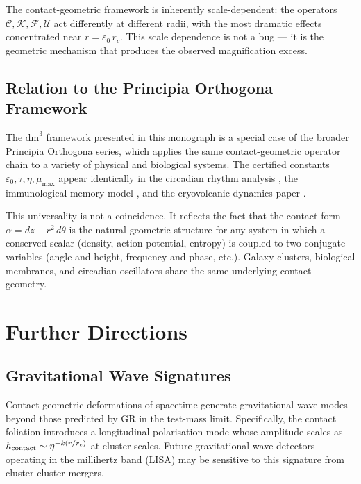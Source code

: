 \documentclass[11pt,a4paper,openright]{book}
\theoremstyle{dm3thm}
\theoremstyle{dm3def}
\newcommand{\dm}{\mathrm{dm}^3}
\newcommand{\eps}{\varepsilon_0}
\newcommand{\rc}{r_c}
\newcommand{\etaT}{\eta}   %
\newcommand{\mumax}{\mu_{\max}}
\newcommand{\UU}{\mathcal{U}}
\newcommand{\FF}{\mathcal{F}}
\newcommand{\KK}{\mathcal{K}}
\newcommand{\CC}{\mathcal{C}}
\begin{document}
The contact-geometric framework is inherently scale-dependent: the operators
$\CC, \KK, \FF, \UU$ act differently at different radii, with the most
dramatic effects concentrated near $r = \eps\,\rc$.  This scale dependence
is not a bug — it is the geometric mechanism that produces the observed
magnification excess.

\section{Relation to the Principia Orthogona Framework}

The $\dm$ framework presented in this monograph is a special case of the
broader Principia Orthogona series, which applies the same contact-geometric
operator chain to a variety of physical and biological systems.  The certified
constants $\eps, \tau, \etaT, \mumax$ appear identically in the circadian
rhythm analysis \citep{Grossi2026circadian}, the immunological memory model
\citep{Grossi2026immunology}, and the cryovolcanic dynamics paper
\citep{Grossi2026cryovol}.

This universality is not a coincidence.  It reflects the fact that the
contact form $\alpha = dz - r^2\,d\theta$ is the natural geometric structure
for any system in which a conserved scalar (density, action potential, entropy)
is coupled to two conjugate variables (angle and height, frequency and phase,
etc.).  Galaxy clusters, biological membranes, and circadian oscillators share
the same underlying contact geometry.

\chapter{Further Directions}
\label{ch:directions}

\section{Gravitational Wave Signatures}

Contact-geometric deformations of spacetime generate gravitational wave modes
beyond those predicted by GR in the test-mass limit.  Specifically, the
contact foliation introduces a longitudinal polarisation mode whose amplitude
scales as $h_{\rm contact} \sim \eta^{-k(r/\rc)}$ at cluster scales.  Future
gravitational wave detectors operating in the millihertz band (LISA) may be
sensitive to this signature from cluster-cluster mergers.
\end{document}
